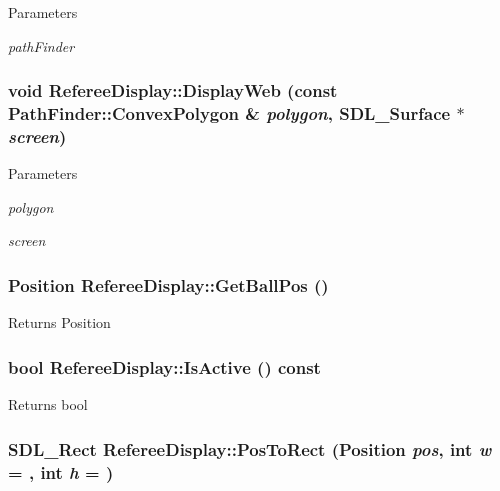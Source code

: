 \begin{DoxyParams}{Parameters}
\item[{\em pathFinder}]\end{DoxyParams}
\hypertarget{classRefereeDisplay_ae40cc8040d1fe441a8f38fe2fc0b8974}{
\subsubsection[{DisplayWeb}]{\setlength{\rightskip}{0pt plus 5cm}void RefereeDisplay::DisplayWeb (const {\bf PathFinder::ConvexPolygon} \& {\em polygon}, \/  SDL\_\-Surface $\ast$ {\em screen})}}
\label{classRefereeDisplay_ae40cc8040d1fe441a8f38fe2fc0b8974}

\begin{DoxyParams}{Parameters}
\item[{\em polygon}]\item[{\em screen}]\end{DoxyParams}
\hypertarget{classRefereeDisplay_afa7601bcd5b6361398f48f2fb1d6ead4}{
\subsubsection[{GetBallPos}]{\setlength{\rightskip}{0pt plus 5cm}Position RefereeDisplay::GetBallPos ()}}
\label{classRefereeDisplay_afa7601bcd5b6361398f48f2fb1d6ead4}
\begin{DoxyReturn}{Returns}
Position 
\end{DoxyReturn}
\hypertarget{classRefereeDisplay_a216bbade42b7c7694f69d73c35620fc6}{
\subsubsection[{IsActive}]{\setlength{\rightskip}{0pt plus 5cm}bool RefereeDisplay::IsActive () const}}
\label{classRefereeDisplay_a216bbade42b7c7694f69d73c35620fc6}
\begin{DoxyReturn}{Returns}
bool 
\end{DoxyReturn}
\hypertarget{classRefereeDisplay_a56d7e17a5fb16cbe64fb7ef3e4f28af0}{
\subsubsection[{PosToRect}]{\setlength{\rightskip}{0pt plus 5cm}SDL\_\-Rect RefereeDisplay::PosToRect (Position {\em pos}, \/  int {\em w} = {}, \/  int {\em h} = {})}}
\label{classRefereeDisplay_a56d7e17a5fb16cbe64fb7ef3e4f28af0}

